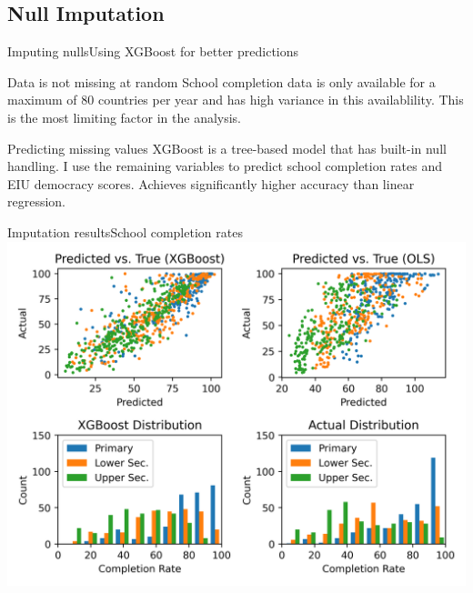 \documentclass[10pt]{beamer}
\begin{document}
\subsection{Null Imputation}
\begin{frame}{Imputing nulls}{Using XGBoost for better predictions}
    \begin{block}{Data is not missing at random}
        School completion data is only available for a maximum of 80 countries per year and has high variance in this availablility.
        This is the most limiting factor in the analysis.
    \end{block}

    \begin{block}{Predicting missing values}
        XGBoost is a tree-based model that has built-in null handling. I use the remaining variables to predict school completion rates and EIU democracy scores.
        Achieves significantly higher accuracy than linear regression.
    \end{block}
    
\end{frame}

\begin{frame}{Imputation results}{School completion rates}
    \centering
    \includegraphics[width=\textwidth]{../build/xgboost.png}
\end{frame}
\end{document}
